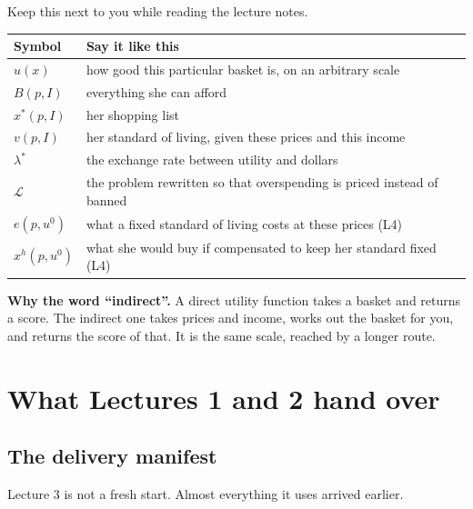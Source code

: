 \documentclass[11pt,letterpaper]{article}
\theoremstyle{definition}
\theoremstyle{plain}
\newcommand{\src}[1]{{\small\textsf{(#1)}}}
\begin{document}
Keep this next to you while reading the lecture notes.

\begin{center}
\begin{tabular}{@{}ll@{}}
\toprule
\textbf{Symbol} & \textbf{Say it like this} \\
\midrule
$u(x)$ & how good this particular basket is, on an arbitrary scale \\
$B(p,I)$ & everything she can afford \\
$x^*(p,I)$ & her shopping list \\
$v(p,I)$ & her standard of living, given these prices and this income \\
$\lambda^*$ & the exchange rate between utility and dollars \\
$\mathcal{L}$ & the problem rewritten so that overspending is priced instead of banned \\
$e(p,u^0)$ & what a fixed standard of living costs at these prices \src{L4} \\
$x^h(p,u^0)$ & what she would buy if compensated to keep her standard fixed \src{L4} \\
\bottomrule
\end{tabular}
\end{center}

\textbf{Why the word ``indirect''.} A direct utility function takes a basket and returns a score.
The indirect one takes prices and income, works out the basket for you, and returns the score of
that. It is the same scale, reached by a longer route.

\section{What Lectures 1 and 2 hand over}

\subsection{The delivery manifest}

Lecture 3 is not a fresh start. Almost everything it uses arrived earlier.
\end{document}
